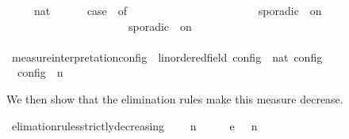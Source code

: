 \begin{isabellebody}
\isanewline
\ \ {\isacartoucheopen}{\isasymmu}\ {\isacharbrackleft}{\isacharbrackright}\ {\isacharequal}\ {\isacharparenleft}{}{\isacharcolon}{\isacharcolon}nat{\isacharparenright}{\isacartoucheclose}\isanewline
{\isacharbar}\ {\isacartoucheopen}{\isasymmu}\ {\isacharparenleft}{\isasymphi}\ {\isacharhash}\ {\isasymPhi}{\isacharparenright}\ {\isacharequal}\ {\isacharparenleft}case\ {\isasymphi}\ of\isanewline
\ \ \ \ \ \ \ \ \ \ \ \ \ \ \ \ \ \ \ \ \ \ {\isacharunderscore}\ sporadic\ {\isacharunderscore}\ on\ {\isacharunderscore}\ {\isasymRightarrow}\ {}\ {\isacharplus}\ {\isasymmu}\ {\isasymPhi}\isanewline
\ \ \ \ \ \ \ \ \ \ \ \ \ \ \ \ \ \ \ \ {\isacharbar}\ {\isacharunderscore}\ sporadic{\isasymsharp}\ {\isacharunderscore}\ on\ {\isacharunderscore}\ {\isasymRightarrow}\ {}\ {\isacharplus}\ {\isasymmu}\ {\isasymPhi}\isanewline
\ \ \ \ \ \ \ \ \ \ \ \ \ \ \ \ \ \ \ \ {\isacharbar}\ {\isacharunderscore}\ \ \ \ \ \ \ \ \ \ \ \ \ \ \ \ \ {\isasymRightarrow}\ {}\ {\isacharplus}\ {\isasymmu}\ {\isasymPhi}{\isacharparenright}{\isacartoucheclose}\isanewline
\isanewline
{}\isamarkupfalse%
\ measure{\isacharunderscore}interpretation{\isacharunderscore}config\ {\isacharcolon}{\isacharcolon}\ {\isacartoucheopen}{\isacharprime}{\isasymtau}{\isacharcolon}{\isacharcolon}linordered{\isacharunderscore}field\ config\ {\isasymRightarrow}\ nat{\isacartoucheclose}\ {\isacharparenleft}{\isacartoucheopen}{\isasymmu}\isactrlsub c\isactrlsub o\isactrlsub n\isactrlsub f\isactrlsub i\isactrlsub g{\isacartoucheclose}{\isacharparenright}\isanewline
{}\isanewline
\ \ {\isacartoucheopen}{\isasymmu}\isactrlsub c\isactrlsub o\isactrlsub n\isactrlsub f\isactrlsub i\isactrlsub g\ {\isacharparenleft}{\isasymGamma}{\isacharcomma}\ n\ {\isasymturnstile}\ {\isasymPsi}\ {\isasymtriangleright}\ {\isasymPhi}{\isacharparenright}\ {\isacharequal}\ {\isasymmu}\ {\isasymPsi}{\isacartoucheclose}%
\begin{isamarkuptext}%
We then show that the elimination rules make this measure decrease.%
\end{isamarkuptext}\isamarkuptrue%
\isamarkupfalse%
\ elimation{\isacharunderscore}rules{\isacharunderscore}strictly{\isacharunderscore}decreasing{\isacharcolon}\isanewline
\ \ \ {\isacartoucheopen}{\isacharparenleft}{\isasymGamma}\ n\ {\isasymturnstile}\ {\isasymPsi}\ {\isasymtriangleright}\ {\isasymPhi}\ \ {\isasymhookrightarrow}\isactrlsub e\ \ {\isacharparenleft}{\isasymGamma}\ n\ {\isasymturnstile}\ {\isasymPsi}\ {\isasymtriangleright}\ {\isasymPhi}\isanewline

\end{isabellebody}

